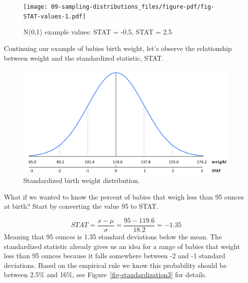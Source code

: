 \documentclass[
  letterpaper,
  DIV=11,
  numbers=noendperiod]{scrreprt}
\theoremstyle{definition}
\theoremstyle{remark}
\begin{document}
\begin{figure}

{\centering \texttt{[image: 09-sampling-distributions\_files/figure-pdf/fig-STAT-values-1.pdf]}

}

\caption{\label{fig-STAT-values}N(0,1) example values: STAT = -0.5, STAT
= 2.5}

\end{figure}

Continuing our example of babies birth weight, let's observe the
relationship between weight and the standardized statistic, STAT.

\begin{figure}

{\centering \includegraphics{images/standardization2.png}

}

\caption{\label{fig-standardization2}Standardized birth weight
distribution.}

\end{figure}

What if we wanted to know the percent of babies that weigh less than 95
ounces at birth? Start by converting the value 95 to STAT.

\[STAT = \frac{x-\mu}{\sigma} = \frac{95-119.6}{18.2}= -1.35\] Meaning
that 95 ounces is 1.35 standard deviations below the mean. The
standardized statistic already gives us an idea for a range of babies
that weight less than 95 ounces because it falls somewhere between -2
and -1 standard deviations. Based on the empirical rule we know this
probability should be between 2.5\% and 16\%, see
Figure~\ref{fig-standardization3} for details.
\end{document}
